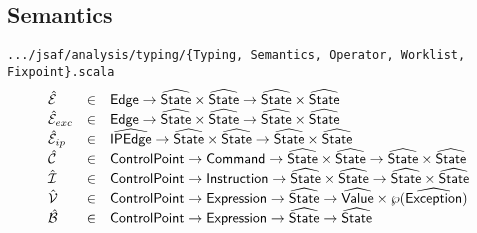 \documentclass{article}
\newcommand{\SF}[1]{\mbox{\textsf{#1}}}
\newcommand{\Command}{\SF{Command}}
\newcommand{\abs}[1]{\widehat{\SF{#1}}}
\newcommand{\aState}{\abs{State}}
\newcommand{\aValue}{\abs{Value}}
\newcommand{\aE}{\hat{\mathcal{E}}}
\newcommand{\aN}{\hat{\mathcal{C}}}
\newcommand{\aB}{\hat{\mathcal{B}}}
\newcommand{\aI}{\hat{\mathcal{I}}}
\newcommand{\aV}{\hat{\mathcal{V}}}
\newcommand{\powerset}[1]{\wp(#1)}
\def\inblue{\color{blue}}
\begin{document}
\newpage
\subsection{Semantics}
{\inblue\tt .../jsaf/analysis/typing/\{Typing, Semantics, Operator, Worklist, Fixpoint\}.scala}\\
\[
\begin{array}{lcl}
  \aE       & \in & \SF{Edge} \rightarrow \aState \times \aState \rightarrow \aState \times \aState\\
  \aE_{exc} & \in & \SF{Edge} \rightarrow \aState \times \aState \rightarrow \aState \times \aState\\
  \aE_{ip}  & \in & \abs{IPEdge} \rightarrow \aState \times \aState \rightarrow \aState \times \aState\\
  \aN & \in & \SF{ControlPoint} \rightarrow \Command \rightarrow \abs{State} \times \abs{State} \rightarrow \abs{State} \times \aState\\
  \aI & \in & \SF{ControlPoint} \rightarrow \SF{Instruction} \rightarrow \aState \times \aState \rightarrow \aState \times \aState\\
  \aV & \in & \SF{ControlPoint} \rightarrow \SF{Expression} \rightarrow \aState \rightarrow \aValue \times \powerset{\abs{Exception}} \\
  \aB & \in & \SF{ControlPoint} \rightarrow \SF{Expression} \rightarrow \aState \rightarrow \aState \\
\end{array}
\]
\end{document}

